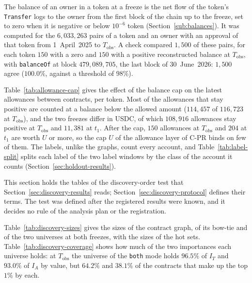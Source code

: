 The balance of an owner in a token at a freeze is the net flow of the token's \texttt{Transfer} logs to the owner from the first block of the chain up to the freeze, set to zero when it is negative or below $10^{-6}$ token (Section~\ref{sub:balances}). It was computed for the $6{,}033{,}263$ pairs of a token and an owner with an approval of that token from 1~April~2025 to $T_{\mathrm{obs}}$. A check compared $1{,}500$ of these pairs, for each token $150$ with a zero and $150$ with a positive reconstructed balance at $T_{\mathrm{obs}}$, with \texttt{balanceOf} at block $479{,}089{,}705$, the last block of 30~June~2026: $1{,}500$ agree ($100.0\%$, against a threshold of $98\%$).

Table~\ref{tab:allowance-cap} gives the effect of the balance cap on the latest allowances between contracts, per token. Most of the allowances that stay positive are counted at a balance below the allowed amount ($114{,}457$ of $116{,}723$ at $T_{\mathrm{obs}}$), and the two freezes differ in USDC, of which $108{,}916$ allowances stay positive at $T_{\mathrm{obs}}$ and $11{,}381$ at $t_1$. After the cap, $150$ allowances at $T_{\mathrm{obs}}$ and $204$ at $t_1$ are worth $U$ or more, so the cap $U$ of the allowance layer of \mbox{C-PR} binds on few of them. The labels, unlike the graphs, count every account, and Table~\ref{tab:label-split} splits each label of the two label windows by the class of the account it counts (Section~\ref{sec:holdout-results}).






This section holds the tables of the discovery-order test that Section~\ref{sec:discovery-results} reads; Section~\ref{sec:discovery-protocol} defines their terms. The test was defined after the registered results were known, and it decides no rule of the analysis plan or the registration.

Table~\ref{tab:discovery-sizes} gives the sizes of the contract graph, of its bow-tie and of the two universes at both freezes, with the sizes of the hot sets. Table~\ref{tab:discovery-coverage} shows how much of the two importances each universe holds: at $T_{\mathrm{obs}}$ the universe of the \texttt{both} mode holds $96.5\%$ of $I_T$ and $93.0\%$ of $I_A$ by value, but $64.2\%$ and $38.1\%$ of the contracts that make up the top $1\%$ by each.


